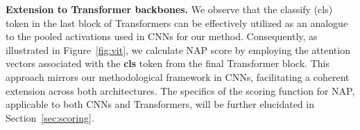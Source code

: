 \noindent \textbf{Extension to Transformer backbones.} We observe that the classify (cls) token in the last block of Transformers can be effectively utilized as an analogue to the pooled activations used in CNNs for our method. Consequently, as illustrated in Figure~\ref{fig:vit}, we calculate NAP score by employing the attention vectors associated with the \textbf{cls} token from the final Transformer block. This approach mirrors our methodological framework in CNNs, facilitating a coherent extension across both architectures. The specifics of the scoring function for NAP, applicable to both CNNs and Transformers, will be further elucidated in Section~\ref{sec:scoring}.